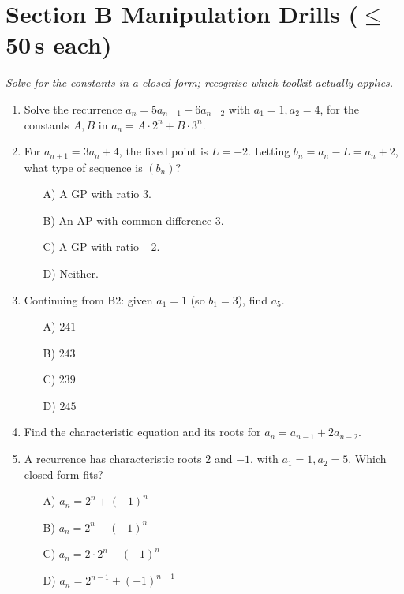 \documentclass[11pt,a4paper]{article}
\begin{document}
\section*{Section B \quad Manipulation Drills \hfill{\normalfont\small($\leq$50\,s each)}}

\noindent\textit{Solve for the constants in a closed form; recognise which toolkit actually applies.}

\begin{enumerate}

\item Solve the recurrence $a_n=5a_{n-1}-6a_{n-2}$ with $a_1=1,a_2=4$, for the constants $A,B$ in $a_n=A\cdot2^n+B\cdot3^n$.

\item For $a_{n+1}=3a_n+4$, the fixed point is $L=-2$. Letting $b_n=a_n-L=a_n+2$, what type of sequence is $(b_n)$?
\begin{itemize}
\item[A)] A GP with ratio $3$.
\item[B)] An AP with common difference $3$.
\item[C)] A GP with ratio $-2$.
\item[D)] Neither.
\end{itemize}

\item Continuing from B2: given $a_1=1$ (so $b_1=3$), find $a_5$.
\begin{itemize}
\item[A)] $241$
\item[B)] $243$
\item[C)] $239$
\item[D)] $245$
\end{itemize}

\item Find the characteristic equation and its roots for $a_n=a_{n-1}+2a_{n-2}$.

\item A recurrence has characteristic roots $2$ and $-1$, with $a_1=1,a_2=5$. Which closed form fits?
\begin{itemize}
\item[A)] $a_n=2^n+(-1)^n$
\item[B)] $a_n=2^n-(-1)^n$
\item[C)] $a_n=2\cdot2^n-(-1)^n$
\item[D)] $a_n=2^{n-1}+(-1)^{n-1}$
\end{itemize}


\end{enumerate}
\end{document}
